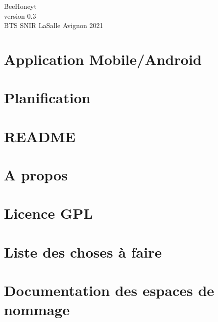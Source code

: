\documentclass[twoside]{article}
\newcommand{\+}{\discretionary{\mbox{\scriptsize$\hookleftarrow$}}{}{}}
\begin{document}
\hypersetup{pageanchor=false,
             bookmarksnumbered=true,
             pdfencoding=unicode
            }
\begin{titlepage}
\vspace*{7cm}

\begin{center}%
{\LARGE Bee\+Honeyt}\\
\vspace*{1cm}
{\large version 0.\+3}\\
\vspace*{1cm}
{\large B\+T\+S S\+N\+I\+R La\+Salle Avignon 2021}\\
\end{center}
\end{titlepage}
\tableofcontents
{}
\hypersetup{pageanchor=true}

\section{Application Mobile/\+Android}
\label{index}\hypertarget{index}{}
\section{Planification}
\label{md_planification}

\section{R\+E\+A\+D\+ME}
\label{page__r_e_a_d_m_e}

\section{A propos}
\label{page_about}

\section{Licence G\+PL}
\label{page_licence}

\section{Liste des choses à faire}
\label{todo}

\section{Documentation des espaces de nommage}



\end{document}
